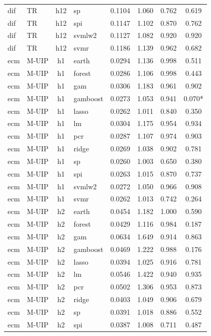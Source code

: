 \begin{ThreePartTable}
\begin{longtable}[t]{llclcccc}
dif & TR & h12 & sp & 0.1104 & 1.060 & 0.762 & 0.619\\
dif & TR & h12 & spi & 0.1147 & 1.102 & 0.870 & 0.762\\
dif & TR & h12 & svmlw2 & 0.1127 & 1.082 & 0.920 & 0.920\\
dif & TR & h12 & svmr & 0.1186 & 1.139 & 0.962 & 0.682\\
\addlinespace
ecm & M-UIP & h1 & earth & 0.0294 & 1.136 & 0.998 & 0.511\\
ecm & M-UIP & h1 & forest & 0.0286 & 1.106 & 0.998 & 0.443\\
ecm & M-UIP & h1 & gam & 0.0306 & 1.183 & 0.961 & 0.902\\
ecm & M-UIP & h1 & gamboost & 0.0273 & 1.053 & 0.941 & 0.070*\\
ecm & M-UIP & h1 & lasso & 0.0262 & 1.011 & 0.840 & 0.350\\
ecm & M-UIP & h1 & lm & 0.0304 & 1.175 & 0.954 & 0.934\\
ecm & M-UIP & h1 & pcr & 0.0287 & 1.107 & 0.974 & 0.903\\
ecm & M-UIP & h1 & ridge & 0.0269 & 1.038 & 0.902 & 0.781\\
ecm & M-UIP & h1 & sp & 0.0260 & 1.003 & 0.650 & 0.380\\
ecm & M-UIP & h1 & spi & 0.0263 & 1.015 & 0.870 & 0.737\\
ecm & M-UIP & h1 & svmlw2 & 0.0272 & 1.050 & 0.966 & 0.908\\
ecm & M-UIP & h1 & svmr & 0.0262 & 1.013 & 0.742 & 0.264\\
\addlinespace
ecm & M-UIP & h2 & earth & 0.0454 & 1.182 & 1.000 & 0.590\\
ecm & M-UIP & h2 & forest & 0.0429 & 1.116 & 0.984 & 0.187\\
ecm & M-UIP & h2 & gam & 0.0634 & 1.649 & 0.914 & 0.863\\
ecm & M-UIP & h2 & gamboost & 0.0469 & 1.222 & 0.988 & 0.176\\
ecm & M-UIP & h2 & lasso & 0.0394 & 1.025 & 0.916 & 0.781\\
ecm & M-UIP & h2 & lm & 0.0546 & 1.422 & 0.940 & 0.935\\
ecm & M-UIP & h2 & pcr & 0.0502 & 1.306 & 0.953 & 0.873\\
ecm & M-UIP & h2 & ridge & 0.0403 & 1.049 & 0.906 & 0.679\\
ecm & M-UIP & h2 & sp & 0.0391 & 1.018 & 0.886 & 0.552\\
ecm & M-UIP & h2 & spi & 0.0387 & 1.008 & 0.711 & 0.487\\

\end{longtable}
\end{ThreePartTable}
